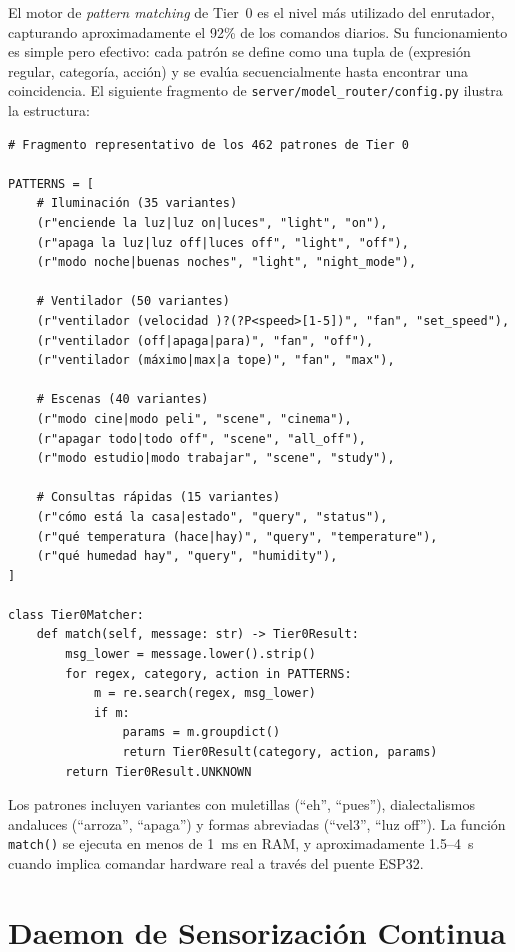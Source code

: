 El motor de \textit{pattern matching} de Tier~0 es el nivel más utilizado del enrutador, capturando aproximadamente el 92\% de los comandos diarios. Su funcionamiento es simple pero efectivo: cada patrón se define como una tupla de (expresión regular, categoría, acción) y se evalúa secuencialmente hasta encontrar una coincidencia. El siguiente fragmento de \texttt{server/model\_router/config.py} ilustra la estructura:

\begin{verbatim}
# Fragmento representativo de los 462 patrones de Tier 0

PATTERNS = [
    # Iluminación (35 variantes)
    (r"enciende la luz|luz on|luces", "light", "on"),
    (r"apaga la luz|luz off|luces off", "light", "off"),
    (r"modo noche|buenas noches", "light", "night_mode"),
    
    # Ventilador (50 variantes)
    (r"ventilador (velocidad )?(?P<speed>[1-5])", "fan", "set_speed"),
    (r"ventilador (off|apaga|para)", "fan", "off"),
    (r"ventilador (máximo|max|a tope)", "fan", "max"),
    
    # Escenas (40 variantes)
    (r"modo cine|modo peli", "scene", "cinema"),
    (r"apagar todo|todo off", "scene", "all_off"),
    (r"modo estudio|modo trabajar", "scene", "study"),
    
    # Consultas rápidas (15 variantes)
    (r"cómo está la casa|estado", "query", "status"),
    (r"qué temperatura (hace|hay)", "query", "temperature"),
    (r"qué humedad hay", "query", "humidity"),
]

class Tier0Matcher:
    def match(self, message: str) -> Tier0Result:
        msg_lower = message.lower().strip()
        for regex, category, action in PATTERNS:
            m = re.search(regex, msg_lower)
            if m:
                params = m.groupdict()
                return Tier0Result(category, action, params)
        return Tier0Result.UNKNOWN
\end{verbatim}

Los patrones incluyen variantes con muletillas (``eh'', ``pues''), dialectalismos andaluces (``arroza'', ``apaga'') y formas abreviadas (``vel3'', ``luz off''). La función \texttt{match()} se ejecuta en menos de 1~ms en RAM, y aproximadamente 1.5--4~s cuando implica comandar hardware real a través del puente ESP32.

\section{Daemon de Sensorización Continua}

